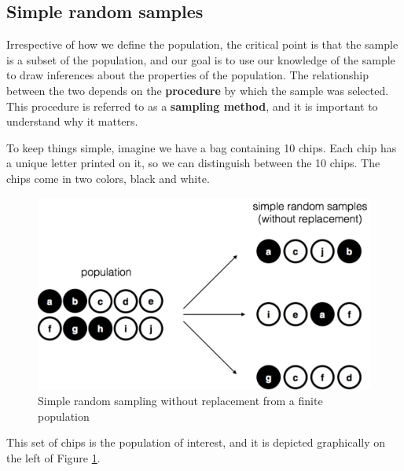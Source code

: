 \documentclass[
]{book}
\begin{document}
\hypertarget{simple-random-samples}{%
\subsection{Simple random samples}\label{simple-random-samples}}

Irrespective of how we define the population, the critical point is that the sample is a subset of the population, and our goal is to use our knowledge of the sample to draw inferences about the properties of the population. The relationship between the two depends on the \textbf{procedure} by which the sample was selected. This procedure is referred to as a \textbf{sampling method}, and it is important to understand why it matters.

To keep things simple, imagine we have a bag containing 10 chips. Each chip has a unique letter printed on it, so we can distinguish between the 10 chips. The chips come in two colors, black and white.

\begin{figure}
\centering
\includegraphics{navarro_img/estimation/srs1.pdf}
\caption{\label{fig:srs1}Simple random sampling without replacement from a finite population}
\end{figure}

This set of chips is the population of interest, and it is depicted graphically on the left of Figure \ref{fig:srs1}.
\end{document}
